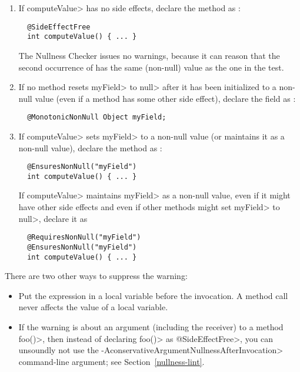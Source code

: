 \begin{enumerate}
\item
  If \<computeValue> has no side effects, declare the method as
  :

\begin{Verbatim}
  @SideEffectFree
  int computeValue() { ... }
\end{Verbatim}

\noindent
The Nullness Checker issues no warnings, because it can reason that
the second occurrence of  has the same (non-null) value as
the one in the test.

\item
  If no method resets \<myField> to \<null> after it has been initialized
  to a non-null value (even if a method has some other side effect),
  declare the field as :

\begin{Verbatim}
  @MonotonicNonNull Object myField;
\end{Verbatim}

\item
  If \<computeValue> sets \<myField> to a non-null value (or maintains it
  as a non-null value), declare the method as
  :

\begin{Verbatim}
  @EnsuresNonNull("myField")
  int computeValue() { ... }
\end{Verbatim}

  If \<computeValue> maintains \<myField> as a non-null value, even if it
  might have other side effects and even if other methods might set
  \<myField> to \<null>, declare it as

\begin{Verbatim}
  @RequiresNonNull("myField")
  @EnsuresNonNull("myField")
  int computeValue() { ... }
\end{Verbatim}
\end{enumerate}

There are two other ways to suppress the warning:

\begin{itemize}
\item
  Put the expression in a local variable before the invocation.  A method
  call never affects the value of a local variable.
\item
  If the warning is about an argument (including the receiver) to a
  method \<foo()>, then instead of declaring \<foo()> as
  \<@SideEffectFree>, you can unsoundly not use the
  \<-AconservativeArgumentNullnessAfterInvocation> command-line argument; see
  Section~\ref{nullness-lint}.
\end{itemize}


